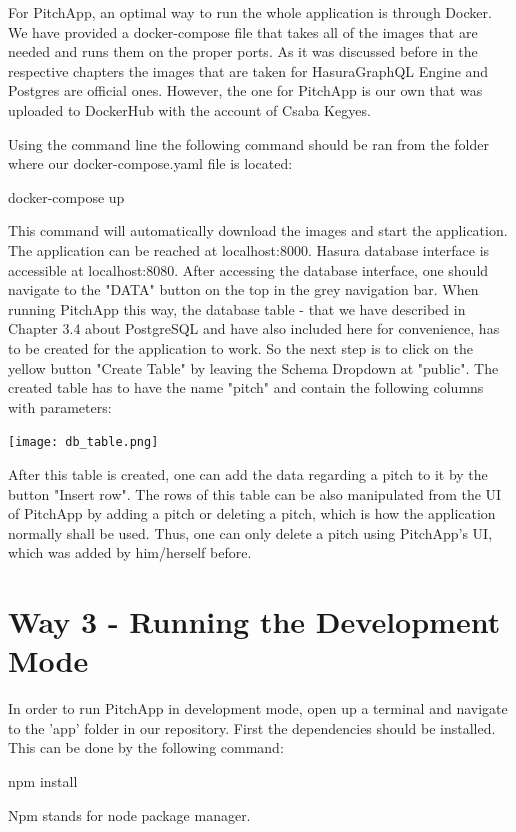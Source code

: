 For PitchApp, an optimal way to run the whole application is through Docker. We have provided a docker-compose file that takes all of the images that are needed and runs them on the proper ports. As it was discussed before in the respective chapters the images that are taken for HasuraGraphQL Engine and Postgres are official ones. However, the one for PitchApp is our own that was uploaded to DockerHub with the account of Csaba Kegyes.
 
Using the command line the following command should be ran from the folder where our docker-compose.yaml file is located:

docker-compose up

This command will automatically download the images and start the application. The application can be reached at localhost:8000. Hasura database interface is accessible at localhost:8080. After accessing the database interface, one should navigate to the "DATA" button on the top in the grey navigation bar. When running PitchApp this way, the database table - that we have described in Chapter 3.4 about PostgreSQL and have also included here for convenience, has to be created for the application to work. So the next step is to click on the yellow button "Create Table" by leaving the Schema Dropdown at "public". The created table has to have the name "pitch" and contain the following columns with parameters:

\begin{center}
	\texttt{[image: db\_table.png]}
\end{center}

After this table is created, one can add the data regarding a pitch to it by the button "Insert row". The rows of this table can be also manipulated from the UI of PitchApp by adding a pitch or deleting a pitch, which is how the application normally shall be used. Thus, one can only delete a pitch using PitchApp's UI, which was added by him/herself before.


\section{Way 3 - Running the Development Mode}

In order to run PitchApp in development mode, open up a terminal and navigate to the 'app' folder in our repository. First the dependencies should be installed. This can be done by the following command:

npm install

Npm stands for node package manager.

